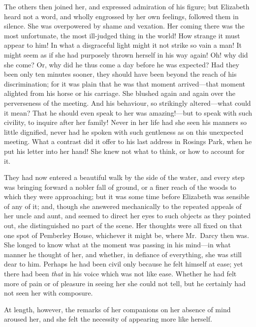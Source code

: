 The others then joined her, and expressed admiration of his
figure; but Elizabeth heard not a word, and wholly engrossed
by her own feelings, followed them in silence.  She was
overpowered by shame and vexation.  Her coming there was
the most unfortunate, the most ill-judged thing in the world!
How strange it must appear to him!  In what a disgraceful light
might it not strike so vain a man!  It might seem as if she
had purposely thrown herself in his way again!  Oh! why did she
come?  Or, why did he thus come a day before he was expected?
Had they been only ten minutes sooner, they should have been
beyond the reach of his discrimination; for it was plain that
he was that moment arrived---that moment alighted from his
horse or his carriage.  She blushed again and again over the
perverseness of the meeting.  And his behaviour, so strikingly
altered---what could it mean?  That he should even speak to her
was amazing!---but to speak with such civility, to inquire after
her family!  Never in her life had she seen his manners so little
dignified, never had he spoken with such gentleness as on this
unexpected meeting.  What a contrast did it offer to his last
address in Rosings Park, when he put his letter into her hand!
She  knew not what to think, or how to account for it.

They had now entered a beautiful walk by the side of the water,
and every step was bringing forward a nobler fall of ground, or
a finer reach of the woods to which they were approaching; but
it was some time before Elizabeth was sensible of any of it;
and, though she answered mechanically to the repeated appeals
of her uncle and aunt, and seemed to direct her eyes to such
objects as they pointed out, she distinguished no part of
the scene.  Her thoughts were all fixed on that one spot of
Pemberley House, whichever it might be, where Mr.\ Darcy then
was.  She longed to know what at the moment was passing in
his mind---in what manner he thought of her, and whether, in
defiance of everything, she was still dear to him.  Perhaps he
had been civil only because he felt himself at ease; yet there
had been \emph{that} in his voice which was not like ease.  Whether he
had felt more of pain or of pleasure in seeing her she could
not tell, but he certainly had not seen her with composure.

At length, however, the remarks of her companions on her
absence of mind aroused her, and she felt the necessity of
appearing more like herself.

